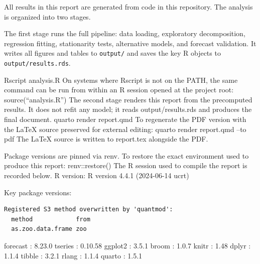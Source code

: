 \documentclass[
  english,
  a4paper,
]{article}
\begin{document}
All results in this report are generated from code in this repository.
The analysis is organized into two stages.

The first stage runs the full pipeline: data loading, exploratory
decomposition, regression fitting, stationarity tests, alternative
models, and forecast validation. It writes all figures and tables to
\texttt{output/} and saves the key R objects to
\texttt{output/results.rds}.

Rscript analysis.R On systems where Rscript is not on the PATH, the same
command can be run from within an R session opened at the project root:
source(``analysis.R'') The second stage renders this report from the
precomputed results. It does not refit any model; it reads
output/results.rds and produces the final document. quarto render
report.qmd To regenerate the PDF version with the LaTeX source preserved
for external editing: quarto render report.qmd --to pdf The LaTeX source
is written to report.tex alongside the PDF.

Package versions are pinned via renv. To restore the exact environment
used to produce this report: renv::restore() The R session used to
compile the report is recorded below. R version: R version 4.4.1
(2024-06-14 ucrt)

Key package versions:

\begin{verbatim}
Registered S3 method overwritten by 'quantmod':
  method            from
  as.zoo.data.frame zoo 
\end{verbatim}

forecast : 8.23.0 tseries : 0.10.58 ggplot2 : 3.5.1 broom : 1.0.7 knitr
: 1.48 dplyr : 1.1.4 tibble : 3.2.1 rlang : 1.1.4 quarto : 1.5.1
\end{document}
